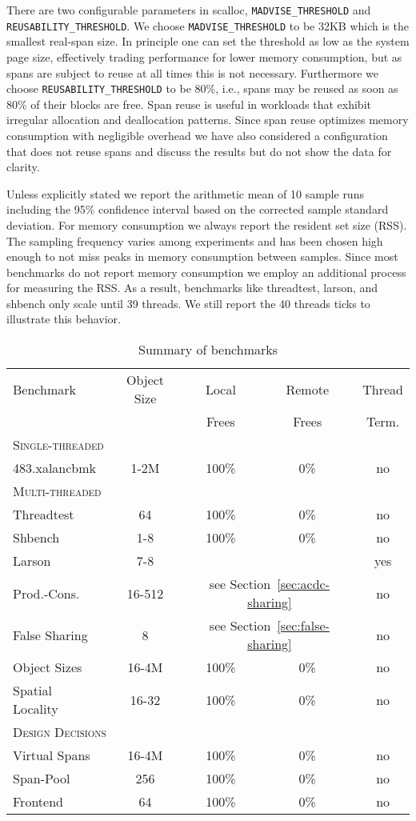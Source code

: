 \documentclass[10pt]{sigplanconf}
\newcommand{\impl}[1]{{\tt #1}\xspace}
\begin{document}
There are two configurable parameters in scalloc,
\impl{MADVISE\_THRESHOLD} and \impl{REUSABILITY\_THRESHOLD}. We choose
\impl{MADVISE\_THRESHOLD} to be 32KB which is the smallest real-span
size. In principle one can set the threshold as low as the system page size,
effectively trading performance for lower memory consumption, but as spans are
subject to reuse at all times this is not necessary. Furthermore we choose
\impl{REUSABILITY\_THRESHOLD} to be 80\%, i.e., spans may be reused as soon as
80\% of their blocks are free.
Span reuse is useful in workloads that exhibit irregular
allocation and deallocation patterns.
Since span reuse optimizes memory consumption with negligible overhead
we have also considered a configuration that does not reuse spans
and discuss the results but do not show the data for clarity.


Unless explicitly stated we report the arithmetic mean of 10 sample runs
including the 95\% confidence interval based on the corrected sample standard
deviation. For memory consumption we always report the resident set size (RSS).
The sampling frequency  varies among experiments and has been chosen high enough
to not miss peaks in memory consumption between samples. Since most benchmarks
do not report memory consumption we employ an additional process for measuring
the RSS. As a result, benchmarks like threadtest, larson, and shbench only scale
until 39 threads. We still report the 40 threads ticks to illustrate this
behavior. 


\begin{table}[t]
\centering
\caption{Summary of benchmarks}
\label{tbl:benchmarks}
\footnotesize
\begin{tabular}{lcccc}
\toprule
{\sc Benchmark} & {\sc Object Size} & {\sc Local} & {\sc Remote}  & {\sc Thread} \\
& {\sc  [Bytes]} & {\sc Frees} & {\sc Frees} & {\sc Term.} \\
\midrule
\multicolumn{5}{l}{\textsc{Single-threaded}}\\
483.xalancbmk & 1-2M & 100\% & 0\% & no \\
\midrule
\multicolumn{5}{l}{\textsc{Multi-threaded}}\\
Threadtest & 64 & 100\% & 0\% & no \\
Shbench & 1-8 & 100\% & 0\% & no \\
Larson & 7-8 &  &  & yes \\
Prod.-Cons. & 16-512  & 
  \multicolumn{2}{c}{see Section~\ref{sec:acdc-sharing}} & no \\
False Sharing & 8 & 
  \multicolumn{2}{c}{see Section~\ref{sec:false-sharing}} & no \\
Object Sizes & 16-4M & 100\% & 0\% & no \\
Spatial Locality & 16-32 & 100\% & 0\% & no \\
\midrule
\multicolumn{5}{l}{\textsc{Design Decisions}}\\
Virtual Spans & 16-4M & 100\% & 0\% & no\\
Span-Pool & 256 & 100\% & 0\% & no\\
Frontend & 64 & 100\% & 0\% & no\\
\bottomrule
\end{tabular}
\end{table}
\end{document}
